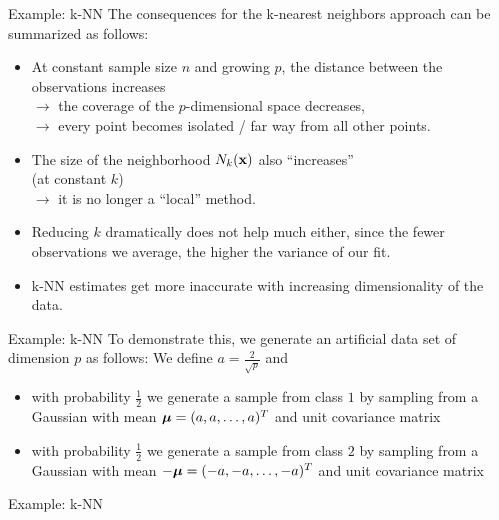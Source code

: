 \documentclass[11pt,compress,t,notes=noshow, xcolor=table]{beamer}
\begin{document}
\begin{framev}{Example: k-NN}
The consequences for the k-nearest neighbors approach can be summarized as follows:

\begin{itemize}
 \item At constant sample size $n$ and growing $p$, the distance between the observations increases\\
 $\rightarrow$ the coverage of the $p$-dimensional space decreases,\\
 $\rightarrow$ every point becomes isolated / far way from all other points.
 \item The size of the neighborhood $N_k(\mathbf{x})$ also \enquote{increases}\\
       (at constant $k$) \\
       $\rightarrow$ it is no longer a \enquote{local} method.
 \item Reducing $k$ dramatically does not help much either,
since the fewer observations we average, the higher the variance of our fit.
 \item[$\rightarrow$] k-NN estimates get more inaccurate with increasing dimensionality of the data.
\end{itemize}
\end{framev}

\begin{framev}{Example: k-NN}
To demonstrate this, we generate an artificial data set of dimension $p$ as follows: We define $a = \frac{2}{\sqrt{p}}$ and

\begin{itemize}
\item with probability $\frac{1}{2}$ we generate a sample from class $1$ by sampling from a Gaussian with mean $\bm{\mu} = (a, a, \ldots, a)^T$ and unit covariance matrix
\item with probability $\frac{1}{2}$ we generate a sample from class $2$ by sampling from a  Gaussian with mean $-\bm{\mu} = (-a, -a, \ldots, -a)^T$ and unit covariance matrix
\end{itemize}
\end{framev}

\begin{framev}{Example: k-NN}
\end{framev}
\end{document}
